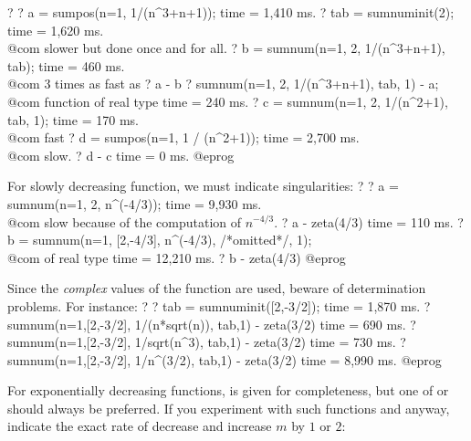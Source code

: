 \bprog
? 
? a = sumpos(n=1, 1/(n^3+n+1));
time = 1,410 ms.
? tab = sumnuminit(2);
time = 1,620 ms. \\@com slower but done once and for all.
? b = sumnum(n=1, 2, 1/(n^3+n+1), tab);
time = 460 ms. \\@com 3 times as fast as 
? a - b
? sumnum(n=1, 2, 1/(n^3+n+1), tab, 1) - a; \\@com function of real type
time = 240 ms.
? c = sumnum(n=1, 2, 1/(n^2+1), tab, 1);
time = 170 ms. \\@com fast
? d = sumpos(n=1, 1 / (n^2+1));
time = 2,700 ms. \\@com slow.
? d - c
time = 0 ms.
@eprog

For slowly decreasing function, we must indicate singularities:
\bprog
? 
? a = sumnum(n=1, 2, n^(-4/3));
time = 9,930 ms. \\@com slow because of the computation of $n^{-4/3}$.
? a - zeta(4/3)
time = 110 ms.
? b = sumnum(n=1, [2,-4/3], n^(-4/3), /*omitted*/, 1); \\@com of real type
time = 12,210 ms.
? b - zeta(4/3)
@eprog

Since the \emph{complex} values of the function are used, beware of
determination problems. For instance:
\bprog
? 
? tab = sumnuminit([2,-3/2]);
time = 1,870 ms.
? sumnum(n=1,[2,-3/2], 1/(n*sqrt(n)), tab,1) - zeta(3/2)
time = 690 ms.
? sumnum(n=1,[2,-3/2], 1/sqrt(n^3), tab,1) - zeta(3/2)
time = 730 ms.
? sumnum(n=1,[2,-3/2], 1/n^(3/2), tab,1) - zeta(3/2)
time = 8,990 ms.
@eprog

For exponentially decreasing functions,  is given for
completeness, but one of  or  should always be
preferred. If you experiment with such functions and  anyway,
indicate the exact rate of decrease and increase $m$ by $1$ or $2$:

